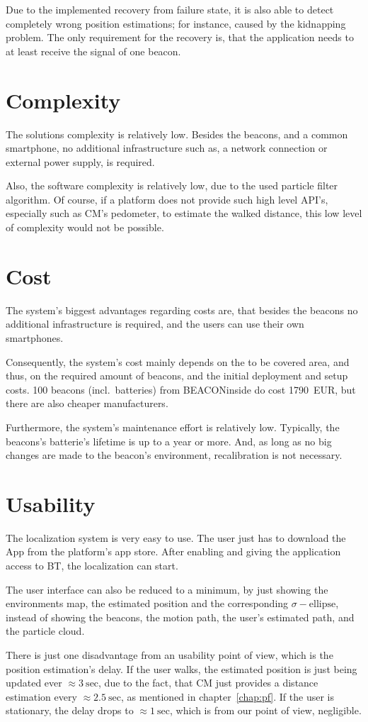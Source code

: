 Due to the implemented recovery from failure state, it is also able to detect completely wrong position estimations; for instance, caused by the kidnapping problem. The only requirement for the recovery is, that the application needs to at least receive the signal of one beacon.

\section{Complexity}
The solutions complexity is relatively low. Besides the beacons, and a common smartphone, no additional infrastructure such as, a network connection or external power supply, is required.
	
Also, the software complexity is relatively low, due to the used particle filter algorithm. Of course, if a platform does not provide such high level \acs{API}'s, especially such as \acl{CM}'s pedometer, to estimate the walked distance, this low level of complexity would not be possible.

\section{Cost}
The system's biggest advantages regarding costs are, that besides the beacons no additional infrastructure is required, and the users can use their own smartphones.

Consequently, the system's cost mainly depends on the to be covered area, and thus, on the required amount of beacons, and the initial deployment and setup costs. 100 beacons (incl.\ batteries) from BEACONinside do cost 1790~EUR, but there are also cheaper manufacturers.

Furthermore, the system's maintenance effort is relatively low. Typically, the beacons's batterie's lifetime is up to a year or more. And, as long as no big changes are made to the beacon's environment, recalibration is not necessary.

\section{Usability}
The localization system is very easy to use. The user just has to download the App from the platform's app store. After enabling and giving the application access to \acl{BT}, the localization can start.

The user interface can also be reduced to a minimum, by just showing the environments map, the estimated position and the corresponding $\sigma-\text{ellipse}$, instead of showing the beacons, the motion path, the user's estimated path, and the particle cloud.

There is just one disadvantage from an usability point of view, which is the position estimation's delay. If the user walks, the estimated position is just being updated ever $\approx 3~\text{sec}$, due to the fact, that \acs{CM} just provides a distance estimation every $\approx 2.5~\text{sec}$, as mentioned in chapter~\ref{chap:pf}. If the user is stationary, the delay drops to $\approx 1~\text{sec}$, which is from our point of view, negligible. 
